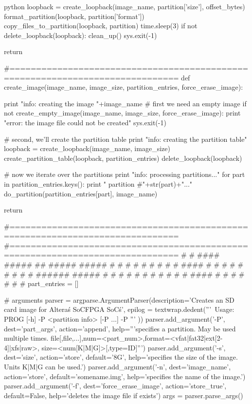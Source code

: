 \begin{code-block}{python}
    loopback = create_loopback(image_name, partition['size'], offset_bytes)
    format_partition(loopback, partition['format'])
    copy_files_to_partition(loopback, partition)
    time.sleep(3)
    if not delete_loopback(loopback):
        clean_up()
        sys.exit(-1)

    return

#==============================================================================
def create_image(image_name, image_size, partition_entries, force_erase_image):

    print "info: creating the image "+image_name
    # first we need an empty image
    if not create_empty_image(image_name, image_size, force_erase_image):
        print "error: the image file could not be created"
        sys.exit(-1)

    # second, we'll create the partition table
    print "info: creating the partition table"
    loopback = create_loopback(image_name, image_size)
    create_partition_table(loopback, partition_entries)
    delete_loopback(loopback)

    # now we iterate over the partitions
    print "info: processing partitions..."
    for part in partition_entries.keys():
        print "     partition #"+str(part)+"..."
        do_partition(partition_entries[part], image_name)

    return

#==============================================================================
#==============================================================================
#
#   ####    #####    ##    #####    #####
#  #          #     #  #   #    #     #
#   ####      #    #    #  #    #     #
#       #     #    ######  #####      #
#  #    #     #    #    #  #   #      #
#   ####      #    #    #  #    #     #
#
part_entries = []

# arguments
parser = argparse.ArgumentParser(description='Creates an SD card image for Altera\'s SoCFPGA SoC\'s',
                                 epilog = textwrap.dedent('''\
Usage: PROG [-h] -P <partition info> [-P ...]
-P
'''
))
parser.add_argument('-P', dest='part_args', action='append',
                    help='''specifies a partition. May be used multiple times.
                            file[,file,...],num=<part_num>,format=<vfat|fat32|ext[2-4]|xfs|raw>,
                            size=<num[K|M|G]>[,type=ID]''')
parser.add_argument('-s', dest='size', action='store',
                    default='8G', help='specifies the size of the image. Units K|M|G can be used.')
parser.add_argument('-n', dest='image_name', action='store',
                    default='somename.img', help='specifies the name of the image.')
parser.add_argument('-f', dest='force_erase_image', action='store_true',
                    default=False, help='deletes the image file if exists')
args = parser.parse_args()


\end{code-block}
